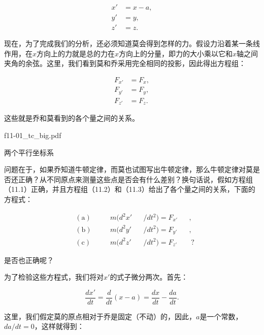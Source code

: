 \documentclass[12pt,oneside]{book}
\providecommand{\ddt}[2]{\frac{d#1}{d#2}}
\begin{document}
\begin{equation}
\begin{aligned}
x'&=x-a,\\[.5ex]
y'&=y,\\[.5ex]
z'&=z.
\end{aligned}
\label{Eq:I:11:2}
\end{equation}

现在，为了完成我们的分析，还必须知道莫会得到怎样的力。假设力沿着某一条线作用，在$x$方向上的力就是总的力在$x$方向上的分量，即力的大小乘以它和$x$轴之间夹角的余弦。这里，我们看到莫和乔采用完全相同的投影，因此得出方程组：

\begin{equation}
\begin{aligned}
F_{x'}&=F_x,\\[.75ex]
F_{y'}&=F_y,\\[.75ex]
F_{z'}&=F_z.
\end{aligned}
\label{Eq:I:11:3}
\end{equation}

这些就是乔和莫看到的各个量之间的关系。

\begin{fig}{f11-01_tc_big.pdf}
\caption{两个平行坐标系}
\label{fig:图11-1}
\end{fig}


问题在于，如果乔知道牛顿定律，而莫也试图写出牛顿定律，那么牛顿定律对莫是否还正确？从不同原点来测量这些点是否会有什么差别？换句话说，假如方程组（11.1）正确，并且方程组（11.2）和（11.3）给出了各个量之间的关系，下面的方程式：

\begin{equation}
\begin{alignedat}{4}
&(\text{a})\quad&&m(d^2x'&&/dt^2)=F_{x'}&&,\\[.5ex]
&(\text{b})\quad&&m(d^2y'&&/dt^2)=F_{y'}&&,\\[.5ex]
&(\text{c})\quad&&m(d^2z'&&/dt^2)=F_{z'}&&\;?
\end{alignedat}
\label{Eq:I:11:4}
\end{equation}

是否也正确呢？

为了检验这些方程式，我们将对$x'$的式子微分两次。首先：

\begin{equation*}
\ddt{x'}{t}=\ddt{}{t}(x-a)=\ddt{x}{t}-\ddt{a}{t}.
\end{equation*}

这里，我们假定莫的原点相对于乔是固定（不动）的，因此，$a$是一个常数，$da/dt=0$，这样就得到：
\end{document}
